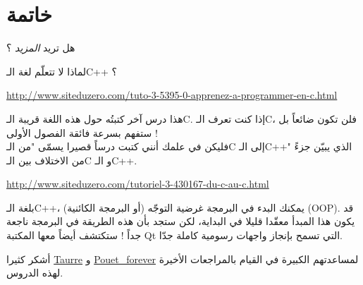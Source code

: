 \chapter*{خاتمة}

هل تريد
\textit{المزيد}
؟

لماذا لا تتعلّم لغة الـ\textenglish{C++}
؟

\url{http://www.siteduzero.com/tuto-3-5395-0-apprenez-a-programmer-en-c.html}

 هذا درس آخر كتبتُه حول هذه اللغة قريبة الـ\textenglish{C}.
 إذا كنت تعرف الـ\textenglish{C}،
فلن تكون ضائعاً بل ستفهم بسرعة فائقة الفصول الأولى !\\
فليكن في علمك أنني كتبت درساً قصيرا يسمّى "من الـ\textenglish{C}
إلى الـ\textenglish{C++}"
الذي يبيّن جزءً من الاختلاف بين الـ\textenglish{C}
و الـ\textenglish{C++}.

\url{http://www.siteduzero.com/tutoriel-3-430167-du-c-au-c.html}

بلغة الـ\textenglish{C++}،
يمكنك البدء في البرمجة غرضية التوجّه (أو البرمجة الكائنية) (\textenglish{OOP}).
قد يكون هذا المبدأ معقّدا قليلا في البداية، لكن ستجد بأن هذه الطريقة في البرمجة ناجعة جداً ! ستكتشف أيضاً معها المكتبة
\textenglish{Qt}
التي تسمح بإنجاز واجهات رسومية كاملة جدّا.

أشكر كثيرا
\href{http://www.siteduzero.com/membres-294-45753.html}{Taurre}
و
\href{http://www.siteduzero.com/membres-294-181268.html}{Pouet\_forever}
لمساعدتهم الكبيرة في القيام بالمراجعات الأخيرة لهذه الدروس.
